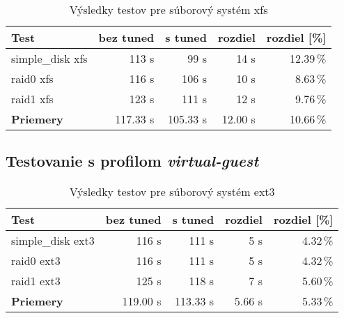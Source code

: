 \begin{table}[H]
\begin{center}
\begin{tabular}{|l|r|r|r|r|}
    \hline
    \textbf{Test} & \textbf{bez tuned} & \textbf{s tuned} & \textbf{rozdiel} & \textbf{rozdiel [\%]} \\ \hline
    simple\_disk xfs & 113 s & 99 s & 14 s & 12.39\,\% \\
    \hline
    raid0 xfs & 116 s & 106 s & 10 s & 8.63\,\% \\
    \hline
    raid1 xfs & 123 s & 111 s & 12 s & 9.76\,\% \\
    \hline
    \textbf{Priemery} & 117.33 s & 105.33 s & 12.00 s & 10.66\,\% \\
    \hline
\end{tabular}
\caption{Výsledky testov pre súborový systém xfs}
\label{tab:results-xfs}
\end{center}
\end{table}

\subsection{Testovanie s profilom \emph{virtual-guest}}

\begin{table}[H]
\begin{center}
\begin{tabular}{|l|r|r|r|r|}
    \hline
    \textbf{Test} & \textbf{bez tuned} & \textbf{s tuned} & \textbf{rozdiel} & \textbf{rozdiel [\%]} \\ \hline
    simple\_disk ext3 & 116 s & 111 s & 5 s & 4.32\,\% \\
    \hline
    raid0 ext3 & 116 s & 111 s & 5 s & 4.32\,\% \\
    \hline
    raid1 ext3 & 125 s & 118 s & 7 s & 5.60\,\% \\
    \hline
    \textbf{Priemery} & 119.00 s & 113.33 s & 5.66 s & 5.33\,\% \\
    \hline
\end{tabular}
\caption{Výsledky testov pre súborový systém ext3}
\label{tab:results-ext3}
\end{center}
\end{table}

